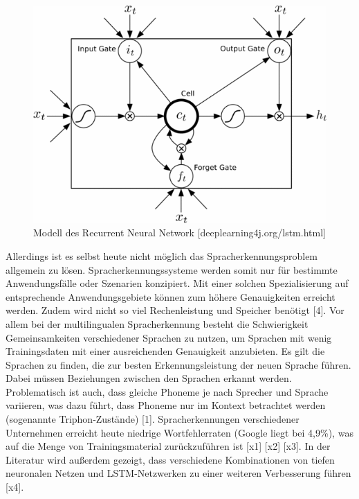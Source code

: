 \begin{figure}[h!]
	\centering
	\includegraphics[width=1\linewidth]{images/lstm_cell}
	\caption{Modell des Recurrent Neural Network [deeplearning4j.org/lstm.html]  \cite{GonzalezDominguez.2015}} %
	\label{fig:topology}
\end{figure}  

Allerdings ist es selbst heute nicht möglich das Spracherkennungsproblem allgemein zu lösen. Spracherkennungssysteme werden somit nur für bestimmte Anwendungsfälle oder Szenarien konzipiert. Mit einer solchen Spezialisierung auf entsprechende Anwendungsgebiete können zum höhere Genauigkeiten erreicht werden. Zudem wird nicht so viel Rechenleistung und Speicher benötigt [4]. Vor allem bei der multilingualen Spracherkennung besteht die Schwierigkeit Gemeinsamkeiten verschiedener Sprachen zu nutzen, um Sprachen mit wenig Trainingsdaten mit einer ausreichenden Genauigkeit anzubieten. Es gilt die Sprachen zu finden, die zur besten Erkennungsleistung der neuen Sprache führen. Dabei müssen Beziehungen zwischen den Sprachen erkannt werden. Problematisch ist auch, dass gleiche Phoneme je nach Sprecher und Sprache variieren, was dazu führt, dass Phoneme nur im Kontext betrachtet werden (sogenannte Triphon-Zustände) [1]. Spracherkennungen verschiedener Unternehmen erreicht heute niedrige Wortfehlerraten (Google liegt bei 4,9\%), was auf die Menge von Trainingsmaterial zurückzuführen ist [x1] [x2] [x3]. In der Literatur wird außerdem gezeigt, dass verschiedene Kombinationen von tiefen neuronalen Netzen und LSTM-Netzwerken zu einer weiteren Verbesserung führen [x4]. 